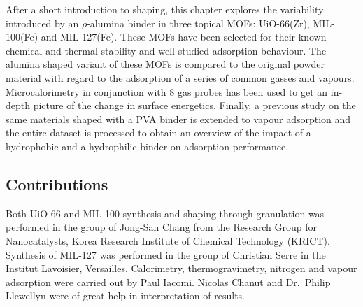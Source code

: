 After a short introduction to shaping, this chapter explores the 
variability introduced by an \( \rho \)-alumina binder in three 
topical \glspl{MOF}: UiO-66(Zr), MIL-100(Fe) and MIL-127(Fe). These \glspl{MOF} 
have been selected for their known chemical and thermal stability 
and well-studied adsorption behaviour.
The alumina shaped variant of these \glspl{MOF} is compared to the original
powder material with regard to the adsorption of a series of common
gasses and vapours. Microcalorimetry in conjunction with 8 gas probes
has been used to get an in-depth picture of the change in surface
energetics.
Finally, a previous study on the same materials shaped with a \gls{PVA}
binder is extended to vapour adsorption and the entire
dataset is processed to obtain an overview of the impact of a
hydrophobic and a hydrophilic binder on adsorption performance.

\subsection*{Contributions}

Both UiO-66 and MIL-100 synthesis and shaping through granulation was performed
in the group of Jong-San Chang from the Research Group for Nanocatalysts,
Korea Research Institute of Chemical Technology (KRICT). Synthesis 
of MIL-127 was performed in the group of Christian Serre in 
the Institut Lavoisier, Versailles. Calorimetry,
thermogravimetry, nitrogen and vapour adsorption were carried out by
Paul Iacomi. Nicolas Chanut and Dr.\ Philip Llewellyn were of great help
in interpretation of results.

